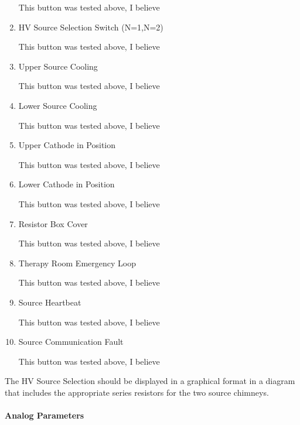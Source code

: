 \documentclass[11pt]{book}		%
\begin{document}
\begin{enumerate}
\color{red}
This button was tested above, I believe
\color{black}

 \item HV Source Selection Switch (N=1,N=2)

\color{red}
This button was tested above, I believe
\color{black}

 \item Upper Source Cooling

\color{red}
This button was tested above, I believe
\color{black}

 \item Lower Source Cooling

\color{red}
This button was tested above, I believe
\color{black}

 \item Upper Cathode in Position

\color{red}
This button was tested above, I believe
\color{black}

 \item Lower Cathode in Position

\color{red}
This button was tested above, I believe
\color{black}

 \item Resistor Box Cover

\color{red}
This button was tested above, I believe
\color{black}

 \item Therapy Room Emergency Loop

\color{red}
This button was tested above, I believe
\color{black}

 \item Source Heartbeat

\color{red}
This button was tested above, I believe
\color{black}

 \item Source Communication Fault

\color{red}
This button was tested above, I believe
\color{black}

\end{enumerate}

The HV Source Selection should be displayed in a graphical format in a diagram that includes the appropriate series resistors for the two source chimneys. 

\paragraph{Analog Parameters}
\end{document}
